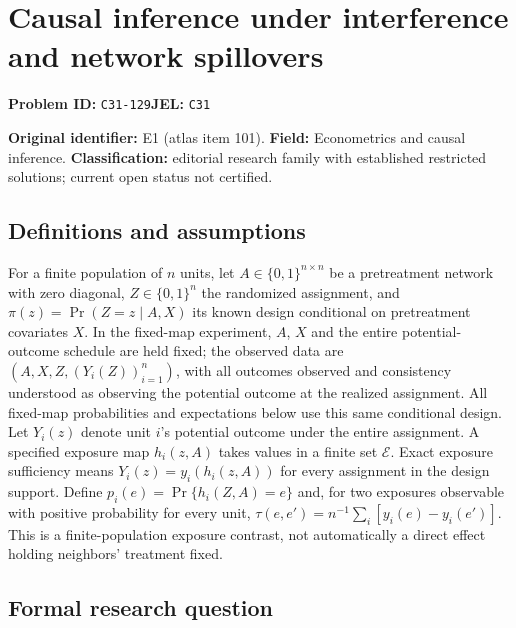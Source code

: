 \documentclass[11pt,a4paper]{article}
\begin{document}
\section*{Causal inference under interference and network spillovers}
\textbf{Problem ID:} \texttt{C31-129}\quad \textbf{JEL:} \texttt{C31}\par
\label{problem:OP-0101}
\label{atlas:prob:E1}

\noindent\textbf{Original identifier:} E1 (atlas item 101). \textbf{Field:} Econometrics and causal inference. \textbf{Classification:} editorial research family with established restricted solutions; current open status not certified.

\subsection*{Definitions and assumptions}

For a finite population of $n$ units, let $A\in\{0,1\}^{n\times n}$ be a pretreatment network with zero diagonal, $Z\in\{0,1\}^n$ the randomized assignment, and $\pi(z)=\Pr(Z=z\mid A,X)$ its known design conditional on pretreatment covariates $X$. In the fixed-map experiment, $A$, $X$ and the entire potential-outcome schedule are held fixed; the observed data are $(A,X,Z,(Y_i(Z))_{i=1}^n)$, with all outcomes observed and consistency understood as observing the potential outcome at the realized assignment. All fixed-map probabilities and expectations below use this same conditional design. Let $Y_i(z)$ denote unit $i$'s potential outcome under the entire assignment. A specified exposure map $h_i(z,A)$ takes values in a finite set $\mathcal E$. Exact exposure sufficiency means $Y_i(z)=y_i(h_i(z,A))$ for every assignment in the design support. Define $p_i(e)=\Pr\{h_i(Z,A)=e\}$ and, for two exposures observable with positive probability for every unit, $\tau(e,e')=n^{-1}\sum_i[y_i(e)-y_i(e')]$. This is a finite-population exposure contrast, not automatically a direct effect holding neighbors' treatment fixed.

\subsection*{Formal research question}
\end{document}
